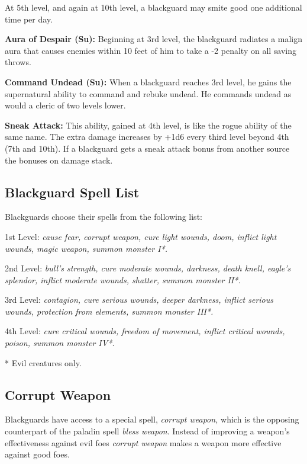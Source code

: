 \documentclass{article}
\begin{document}
At 5th level, and again at 10th level, a blackguard may smite good one additional 
time per day.

\textbf{Aura of Despair (Su):} Beginning at 3rd level, the blackguard radiates 
a malign aura that causes enemies within 10 feet of him to take a -2 penalty on 
all saving throws.

\textbf{Command Undead (Su):} When a blackguard reaches 3rd level, he gains the 
supernatural ability to command and rebuke undead. He commands undead as would 
a cleric of two levels lower.

\textbf{Sneak Attack:} This ability, gained at 4th level, is like the rogue ability 
of the same name. The extra damage increases by +1d6 every third level beyond 4th 
(7th and 10th). If a blackguard gets a sneak attack bonus from another source the 
bonuses on damage stack.

\subsection*{\textbf{Blackguard Spell List}}

Blackguards choose their spells from the following list:

1st Level: \textit{cause fear, corrupt weapon, cure light wounds, doom, inflict 
light wounds, magic weapon, summon monster I*.}

2nd Level: \textit{bull's strength, cure moderate wounds, darkness, death knell, 
eagle's splendor, inflict moderate wounds, shatter, summon monster II*.}

3rd Level: \textit{contagion, cure serious wounds, deeper darkness, inflict serious 
wounds, protection from elements, summon monster III*.}

4th Level: \textit{cure critical wounds, freedom of movement, inflict critical 
wounds, poison, summon monster IV*.}

* Evil creatures only.

\subsection*{\textbf{Corrupt Weapon}}

Blackguards have access to a special spell, \textit{corrupt weapon, }which is the 
opposing counterpart of the paladin spell \textit{bless weapon}. Instead of improving 
a weapon's effectiveness against evil foes \textit{corrupt weapon }makes a weapon 
more effective against good foes.

\vspace{12pt}
\end{document}
